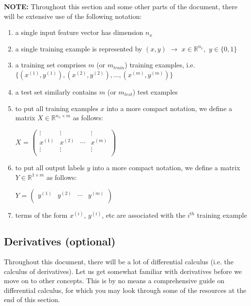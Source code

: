 \documentclass{article}[a4paper,12pt]
\theoremstyle{definition}
\begin{document}
\textbf{NOTE:} Throughout this section and some other parts of the document, there will be extensive use of the following notation:
\begin{enumerate}
	\item a single input feature vector has dimension $n_x$
	\item a single training example is represented by $(x,y)$ $\rightarrow$ $x\in\mathbb{R}^{n_x},$ $y\in\{0,1\}$
	\item a training set comprises $m$ (or $m_{train}$) training examples, i.e. $\{(x^{(1)},y^{(1)}), (x^{(2)},y^{(2)}), \dots, (x^{(m)},y^{(m)})\}$
	\item a test set similarly contains $m$ (or $m_{test}$) test examples
	\item to put all training examples $x$ into a more compact notation, we define a matrix $X\in\mathbb{R}^{n_x\times m}$ as follows:
\begin{center}
$X$ = 
$\begin{pmatrix}
	\vdots & \vdots & & \vdots\\
	x^{(1)} & x^{(2)} & \cdots & x^{(m)}\\
	\vdots & \vdots & & \vdots\\
\end{pmatrix}$
\end{center}
	\item to put all output labels $y$ into a more compact notation, we define a matrix $Y\in\mathbb{R}^{1\times m}$ as follows:
\begin{center}
$Y$ = 
$\begin{pmatrix}
	y^{(1)} & y^{(2)} & \cdots & y^{(m)}\\
\end{pmatrix}$
\end{center}
	\item terms of the form $x^{(i)}$, $y^{(i)}$, etc are associated with the $i^{th}$ training example
\end{enumerate}
\subsection{Derivatives (optional)}
Throughout this document, there will be a lot of differential calculus (i.e. the calculus of derivatives). Let us get somewhat familiar with derivatives before we move on to other concepts. This is by no means a comprehensive guide on differential calculus, for which you may look through some of the resources at the end of this section.
\end{document}
